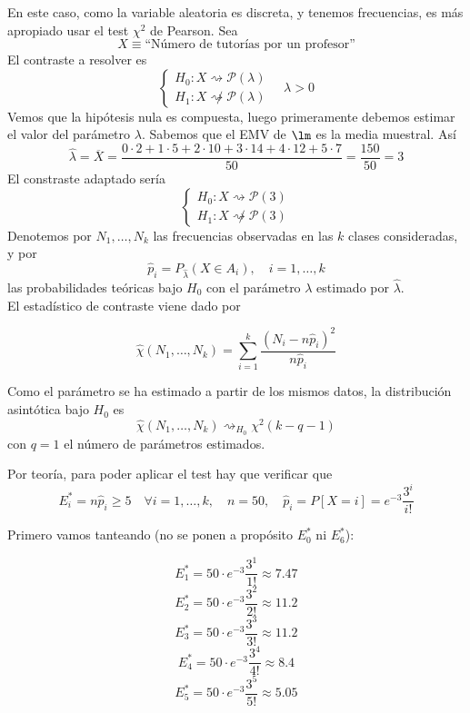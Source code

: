 \documentclass[12pt]{article}
\begin{document}
\begin{ejercicio}
\begin{enumerate}
            En este caso, como la variable aleatoria es discreta, y tenemos frecuencias, es más apropiado usar el test $\chi^2$ de Pearson.
            Sea $$X \equiv \text{``Número de tutorías por un profesor''}$$ El contraste a resolver es
            $$\begin{cases}
                H_0 : X \rightsquigarrow \mathcal{P}(\lambda) \\
                H_1 : X \not\rightsquigarrow \mathcal{P}(\lambda)
            \end{cases} \quad \lambda > 0$$
            Vemos que la hipótesis nula es compuesta, luego primeramente debemos estimar el valor del parámetro $\lambda$. Sabemos que el EMV de $\lm$ es la media muestral. Así
            $$\hat{\lambda} = \overline{X} = \dfrac{0 \cdot 2 + 1 \cdot 5 + 2 \cdot 10 + 3 \cdot 14 + 4 \cdot 12 + 5 \cdot 7}{50} = \dfrac{150}{50} = 3$$
            El constraste adaptado sería 
            $$\begin{cases}
                H_0 : X \rightsquigarrow \mathcal{P}(3) \\
                H_1 : X \not\rightsquigarrow \mathcal{P}(3)
            \end{cases}$$
            Denotemos por $N_1, \ldots, N_k$ las frecuencias observadas en las $k$ clases consideradas, y por
            $$\hat{p}_i = P_{\hat{\lambda}}(X \in A_i), \quad i = 1, \ldots, k$$
            las probabilidades teóricas bajo $H_0$ con el parámetro $\lambda$ estimado por $\hat{\lambda}$. \\

            El estadístico de contraste viene dado por

            $$\hat{\chi}(N_1, \ldots, N_k) = \sum_{i=1}^k \dfrac{(N_i - n \hat{p}_i)^2}{n \hat{p}_i}$$

            Como el parámetro se ha estimado a partir de los mismos datos, la distribución asintótica bajo $H_0$ es 
            $$\hat{\chi}(N_1, \ldots, N_k) \rightsquigarrow_{H_0} \chi^2(k - q - 1)$$
            con $q=1$ el número de parámetros estimados.

            Por teoría, para poder aplicar el test hay que verificar que $$E^*_{i} = n\hat{p}_i \geqslant 5 \quad \forall i = 1, \ldots, k, \quad n = 50, \quad \hat{p}_i = P[X=i] = e^{-3} \dfrac{3^i}{i!}$$

            Primero vamos tanteando (no se ponen a propósito $E^*_0$ ni $E^*_6$):

            $$E^*_1 = 50 \cdot e^{-3} \dfrac{3^1}{1!} \approx 7.47$$
            $$E^*_2 = 50 \cdot e^{-3} \dfrac{3^2}{2!} \approx 11.2$$
            $$E^*_3 = 50 \cdot e^{-3} \dfrac{3^3}{3!} \approx 11.2$$
            $$E^*_4 = 50 \cdot e^{-3} \dfrac{3^4}{4!} \approx 8.4$$
            $$E^*_5 = 50 \cdot e^{-3} \dfrac{3^5}{5!} \approx 5.05$$


\end{enumerate}
\end{ejercicio}
\end{document}
